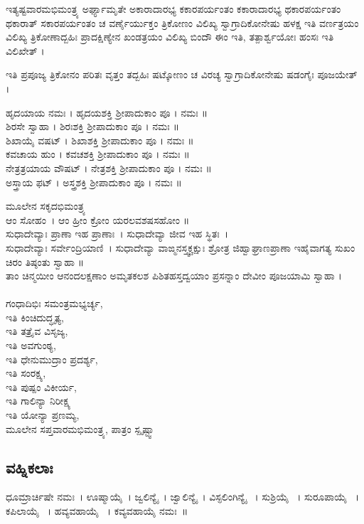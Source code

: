  ಇತ್ಯಷ್ಟವಾರಮಭಿಮಂತ್ರ್ಯ ಅರ್ಘ್ಯಾಮೃತೇ ಅಕಾರಾದಾರಭ್ಯ ಕಕಾರಪರ್ಯಂತಂ ಕಕಾರಾದಾರಭ್ಯ ಥಕಾರಪರ್ಯಂತಂ ಥಕಾರಾತ್ ಸಕಾರಪರ್ಯಂತಂ ಚ ವರ್ಣೈರ್ಯುಕ್ತಂ ತ್ರಿಕೋಣಂ ವಿಲಿಖ್ಯ ಸ್ವಾಗ್ರಾದಿಕೋನೇಷು ಹಳಕ್ಷ ಇತಿ ವರ್ಣತ್ರಯಂ ವಿಲಿಖ್ಯ ತ್ರಿಕೋಣಾದ್ಬಹಿಃ ಪ್ರಾದಕ್ಷಿಣ್ಯೇನ ಖಂಡತ್ರಯಂ ವಿಲಿಖ್ಯ ಬಿಂದೌ ಈಂ ಇತಿ, ತತ್ಪಾರ್ಶ್ವಯೋಃ ಹಂಸಃ ಇತಿ ವಿಲಿಖೇತ್ ।

 ಇತಿ  ಪ್ರಪೂಜ್ಯ ತ್ರಿಕೋನಂ ಪರಿತಃ ವೃತ್ತಂ ತದ್ಬಹಿಃ ಷಟ್ಕೋಣಂ ಚ ವಿರಚ್ಯ ಸ್ವಾಗ್ರಾದಿಕೋನೇಷು ಷಡಂಗೈಃ ಪೂಜಯೇತ್ । 

 ಹೃದಯಾಯ ನಮಃ । ಹೃದಯಶಕ್ತಿ ಶ್ರೀಪಾದುಕಾಂ ಪೂ । ನಮಃ ॥\\
 ಶಿರಸೇ ಸ್ವಾಹಾ । ಶಿರಃಶಕ್ತಿ ಶ್ರೀಪಾದುಕಾಂ ಪೂ । ನಮಃ ॥\\
 ಶಿಖಾಯೈ ವಷಟ್ । ಶಿಖಾಶಕ್ತಿ ಶ್ರೀಪಾದುಕಾಂ ಪೂ । ನಮಃ ॥\\
 ಕವಚಾಯ ಹುಂ । ಕವಚಶಕ್ತಿ ಶ್ರೀಪಾದುಕಾಂ ಪೂ । ನಮಃ ॥\\
 ನೇತ್ರತ್ರಯಾಯ ವೌಷಟ್ । ನೇತ್ರಶಕ್ತಿ ಶ್ರೀಪಾದುಕಾಂ ಪೂ । ನಮಃ ॥\\
 ಅಸ್ತ್ರಾಯ ಫಟ್ । ಅಸ್ತ್ರಶಕ್ತಿ ಶ್ರೀಪಾದುಕಾಂ ಪೂ । ನಮಃ ॥

ಮೂಲೇನ ಸಕೃದಭಿಮಂತ್ರ್ಯ\\
ಆಂ ಸೋಹಂ~। ಆಂ ಹ್ರೀಂ ಕ್ರೋಂ ಯರಲವಶಷಸಹೋಂ ॥\\
ಸುಧಾದೇವ್ಯಾಃ ಪ್ರಾಣಾ ಇಹ ಪ್ರಾಣಾಃ~।
ಸುಧಾದೇವ್ಯಾ ಜೀವ ಇಹ ಸ್ಥಿತಃ~।\\
ಸುಧಾದೇವ್ಯಾಃ ಸರ್ವೇಂದ್ರಿಯಾಣಿ~।
ಸುಧಾದೇವ್ಯಾ ವಾಙ್ಮನಸ್ತ್ವಕ್ಚಕ್ಷುಃ ಶ್ರೋತ್ರ ಜಿಹ್ವಾಘ್ರಾಣಪ್ರಾಣಾ
ಇಹೈವಾಗತ್ಯ ಸುಖಂ ಚಿರಂ ತಿಷ್ಠಂತು ಸ್ವಾಹಾ ॥\\
 ತಾಂ ಚಿನ್ಮಯೀಂ ಆನಂದಲಕ್ಷಣಾಂ ಅಮೃತಕಲಶ ಪಿಶಿತಹಸ್ತದ್ವಯಾಂ ಪ್ರಸನ್ನಾಂ ದೇವೀಂ ಪೂಜಯಾಮಿ ಸ್ವಾಹಾ ।\\
\\
ಗಂಧಾದಿಭಿಃ ಸಮಂತ್ರಮಭ್ಯರ್ಚ್ಯ,\\
 ಇತಿ ಕಿಂಚಿದುದ್ಧೃತ್ಯ,\\
 ಇತಿ ತತ್ರೈವ ವಿಸೃಜ್ಯ,\\
 ಇತಿ ಅವಗುಂಠ್ಯ,\\
 ಇತಿ ಧೇನುಮುದ್ರಾಂ ಪ್ರದರ್ಶ್ಯ,\\
 ಇತಿ ಸಂರಕ್ಷ್ಯ,\\
 ಇತಿ ಪುಷ್ಪಂ ವಿಕೀರ್ಯ,\\
 ಇತಿ ಗಾಲಿನ್ಯಾ ನಿರೀಕ್ಷ್ಯ\\
 ಇತಿ ಯೋನ್ಯಾ ಪ್ರಣಮ್ಯ,\\
ಮೂಲೇನ ಸಪ್ತವಾರಮಭಿಮಂತ್ರ್ಯ, ಪಾತ್ರಂ ಸ್ಪೃಷ್ಟ್ವಾ

\subsection{ವಹ್ನಿಕಲಾಃ}
 ಧೂಮ್ರಾರ್ಚಿಷೇ   ನಮಃ~।  ಊಷ್ಮಾಯೈ~।  ಜ್ವಲಿನ್ಯೈ~।  ಜ್ವಾಲಿನ್ಯೈ~।  ವಿಸ್ಫಲಿಂಗಿನ್ಯೈ ~।  ಸುಶ್ರಿಯೈ ~।  ಸುರೂಪಾಯೈ ~।  ಕಪಿಲಾಯೈ ~।  ಹವ್ಯವಹಾಯೈ ~।  ಕವ್ಯವಹಾಯೈ ನಮಃ~॥
